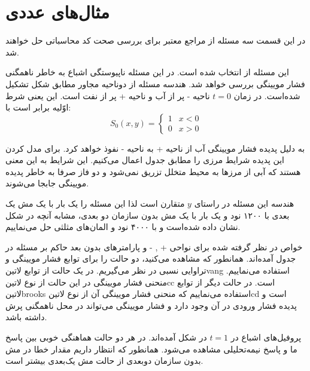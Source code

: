 \chapter{مثال‌های عددی}
\label{ch:fasl4}
در این قسمت سه مسئله از مراجع معتبر برای بررسی صحت کد محاسباتی حل خواهند شد.


این مسئله از  انتخاب شده است. در این مسئله ناپیوستگی اشباع به خاطر ناهمگنی فشار مویینگی بررسی خواهد شد. هندسه مسئله از دوناحیه مجاور مطابق شکل  تشکیل شده‌است. در زمان $t=0$ ناحیه - پر از آب و ناحیه + پر از نفت است. این یعنی شرط اوّلیه برابر است با:
\begin{equation}
\label{eq:4ini}
S_0(x,y)=\begin{cases}
1 &x<0 \\
0 &x>0
\end{cases}
\end{equation}

به دلیل پدیده فشار مویینگی آب از ناحیه + به ناحیه - نفوذ خواهد کرد. برای مدل کردن این پدیده شرایط مرزی را مطابق جدول  اعمال می‌کنیم. این شرایط به این معنی هستند که آبی از مرز‌‌ها به محیط متخلل تزریق نمی‌شود و دو فاز صرفا به خاطر پدیده مویینگی جابجا می‌شوند.

هندسه این مسئله در راستای $y$ متقارن است لذا این مسئله را یک بار با یک مش یک بعدی با ۱۲۰۰ نود و یک بار با یک مش بدون سازمان دو بعدی، مشابه آنچه در شکل  نشان داده شده‌است و با ۴۰۰۰ نود و المان‌های مثلثی حل ‌می‌نماییم. 

خواص در نظر گرفته شده برای نواحی + , - و پارامتر‌های بدون بعد حاکم بر مسئله در جدول  آمده‌اند. همانطور که مشاهده می‌کنید، دو حالت را برای توابع فشار مویینگی و تراوایی نسبی در نظر می‌گیریم. در یک حالت از توابع ‌لاتین{vang} استفاده می‌نماییم. منحنی فشار مویینگی در این حالت از نوع ‌لاتین{cc} است. در حالت دیگر از توابع ‌لاتین{brooks} استفاده می‌نماییم که منحنی فشار مویینگی آن از نوع ‌لاتین{cd} است و پدیده فشار ورودی در آن وجود دارد و فشار مویینگی می‌تواند در محل ناهمگنی پرش داشته باشد.

پروفیل‌های اشباع در $t=1$ در شکل  آمده‌اند. در هر دو حالت هماهنگی خوبی بین پاسخ ما و پاسخ نیمه‌تحلیلی  مشاهده می‌شود. همانطور که انتظار داریم مقدار خطا در مش بدون سازمان دوبعدی از حالت مش یک‌بعدی بیشتر است.

